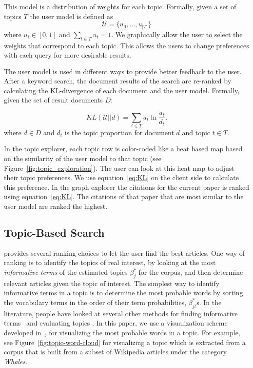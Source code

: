 This model is a distribution of weights for each topic.
Formally, given a set of topics $T$ the user model is defined as
$$
\mathcal{U} = \{u_0, \ldots, u_{|T|}\}
$$
where $u_i \in [0,1]$ and $\sum_{t \in T} u_t = 1$.
We graphically allow the user to select the weights that correspond to
each topic. This allows the users to change preferences with each query
for more desirable results.

The user model is used in different ways to provide better feedback to
the user. After a keyword search, the document results of the search 
are re-ranked by calculating the KL-divergence of each document and the
user model. Formally, given the set of result documents $D$:

\begin{equation} \label{eq:KL}
KL(\mathcal{U}||d) = \sum_{t \in T} u_t \ln \frac{u_t}{d_t}.
\end{equation}
where $d \in D$ and $d_t$ is the topic proportion for document $d$ and
topic $t \in T$. 

In the topic explorer, each topic row is color-coded like a heat 
based map based on the similarity of the user model to that topic (see Figure~\ref{fig:topic_exploration}).
The user can look at this heat map to adjust their topic preferences.
We use equation~\ref{eq:KL} on the client side to calculate this preference. 
In the graph explorer the citations for the current paper is ranked
using equation~\ref{eq:KL}. The citations of that paper that are most
similar to the user model are ranked the highest.


\subsection{Topic-Based Search}

\system provides several ranking choices to let the user find  
the best articles. One way of ranking is to identify the topics of 
real interest, by looking at the most \textsl{informative terms} of 
the estimated topics $\beta_j^{*}$ for the corpus, and then 
determine relevant articles given the topic of interest. The 
simplest way to identify informative terms in a topic is to 
determine the most probable words by sorting the vocabulary terms in 
the order of their term probabilities, $\beta_{jt}^{*}$s. In the 
literature, people have looked at several other methods for finding 
informative terms~\citeauthor{2012-termite} and evaluating topics
\cite{Mimno2011}. In this paper, we use a visualization scheme 
developed in~\cite{Davis2013}, for visualizing the most probable 
words in a topic. For example, see Figure~\ref{fig:topic-word-cloud} 
for visualizing a topic which is extracted from a corpus that is 
built from a subset of Wikipedia articles under the category 
\textsl{Whales}. 
       

